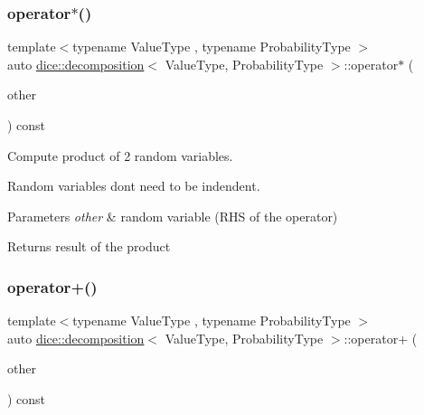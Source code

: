 \subsubsection{\texorpdfstring{operator$\ast$()}{operator*()}}
{\footnotesize\ttfamily template$<$typename Value\+Type , typename Probability\+Type $>$ \\
auto \mbox{\hyperlink{classdice_1_1decomposition}{dice\+::decomposition}}$<$ Value\+Type, Probability\+Type $>$\+::operator$\ast$ (\begin{DoxyParamCaption}\item[{const \mbox{\hyperlink{classdice_1_1decomposition}{decomposition}}$<$ Value\+Type, Probability\+Type $>$ \&}]{other }\end{DoxyParamCaption}) const\hspace{0.3cm}{\ttfamily [inline]}}



Compute product of 2 random variables. 

Random variables don\textquotesingle{}t need to be indendent.


\begin{DoxyParams}{Parameters}
{\em other} & random variable (R\+HS of the operator)\\
\hline
\end{DoxyParams}
\begin{DoxyReturn}{Returns}
result of the product 
\end{DoxyReturn}
\mbox{\label{classdice_1_1decomposition_abfd6869629c7622d95333dafd9d15cd5}} 
\subsubsection{\texorpdfstring{operator+()}{operator+()}}
{\footnotesize\ttfamily template$<$typename Value\+Type , typename Probability\+Type $>$ \\
auto \mbox{\hyperlink{classdice_1_1decomposition}{dice\+::decomposition}}$<$ Value\+Type, Probability\+Type $>$\+::operator+ (\begin{DoxyParamCaption}\item[{const \mbox{\hyperlink{classdice_1_1decomposition}{decomposition}}$<$ Value\+Type, Probability\+Type $>$ \&}]{other }\end{DoxyParamCaption}) const\hspace{0.3cm}{\ttfamily [inline]}}



